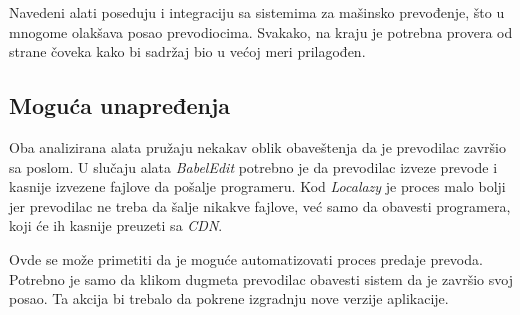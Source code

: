 Navedeni alati poseduju i integraciju sa sistemima za mašinsko prevođenje, što u mnogome olakšava posao 
prevodiocima. Svakako, na kraju je potrebna provera od strane čoveka kako bi sadržaj bio u većoj meri prilagođen. 

\subsection{Moguća unapređenja}\label{sec:analiza-moguca_unapredjenja}

Oba analizirana alata pružaju nekakav oblik obaveštenja da je prevodilac završio sa poslom. U slučaju alata \textit{BabelEdit}
potrebno je da prevodilac izveze prevode i kasnije izvezene fajlove da pošalje programeru. Kod \textit{Localazy} 
je proces malo bolji jer prevodilac ne treba da šalje nikakve fajlove, već samo da obavesti programera, 
koji će ih kasnije preuzeti sa \textit{CDN}.

Ovde se može primetiti da je moguće automatizovati proces predaje prevoda. Potrebno je samo da klikom dugmeta
prevodilac obavesti sistem da je završio svoj posao. Ta akcija bi trebalo da pokrene izgradnju nove verzije aplikacije.